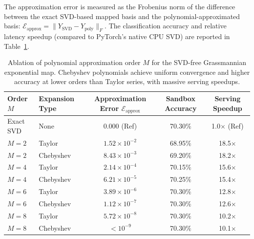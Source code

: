 \documentclass{article}
\theoremstyle{plain}
\theoremstyle{definition}
\theoremstyle{remark}
\begin{document}
The approximation error is measured as the Frobenius norm of the difference between the exact SVD-based mapped basis and the polynomial-approximated basis: $\mathcal{E}_{\text{approx}} = \|Y_{\text{SVD}} - Y_{\text{poly}}\|_F$. The classification accuracy and relative latency speedup (compared to PyTorch's native CPU SVD) are reported in Table~\ref{tab:poly_order_ablation}.

\begin{table}[h]
\centering
\caption{Ablation of polynomial approximation order $M$ for the SVD-free Grassmannian exponential map. Chebyshev polynomials achieve uniform convergence and higher accuracy at lower orders than Taylor series, with massive serving speedups.}
\label{tab:poly_order_ablation}
\vskip 0.1in
\begin{small}
\begin{sc}
\begin{tabular}{llccc}
\toprule
Order $M$ & Expansion Type & Approximation Error $\mathcal{E}_{\text{approx}}$ & Sandbox Accuracy & Serving Speedup \\
\midrule
Exact SVD & None           & 0.000 (Ref)                      & 70.30\%          & 1.0$\times$ (Ref) \\
\midrule
$M=2$     & Taylor         & $1.52 \times 10^{-2}$             & 68.95\%          & 18.5$\times$ \\
$M=2$     & Chebyshev      & $8.43 \times 10^{-3}$             & 69.20\%          & 18.2$\times$ \\
\midrule
$M=4$     & Taylor         & $2.14 \times 10^{-4}$             & 70.15\%          & 15.6$\times$ \\
$M=4$     & Chebyshev      & $6.21 \times 10^{-5}$             & 70.25\%          & 15.4$\times$ \\
\midrule
$M=6$     & Taylor         & $3.89 \times 10^{-6}$             & 70.30\%          & 12.8$\times$ \\
$M=6$     & Chebyshev      & $1.12 \times 10^{-7}$             & 70.30\%          & 12.6$\times$ \\
\midrule
$M=8$     & Taylor         & $5.72 \times 10^{-8}$             & 70.30\%          & 10.2$\times$ \\
$M=8$     & Chebyshev      & $< 10^{-9}$                      & 70.30\%          & 10.1$\times$ \\
\bottomrule
\end{tabular}
\end{sc}
\end{small}
\end{table}
\end{document}
